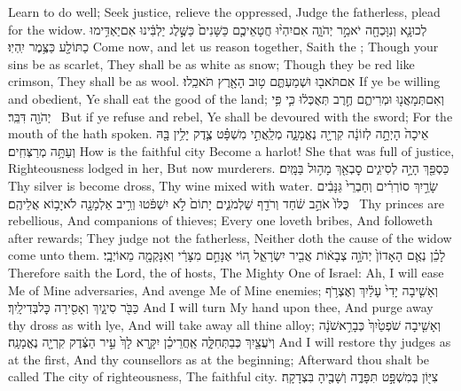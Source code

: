 {Learn to do well; Seek justice, relieve the oppressed, Judge the fatherless, plead for the widow.}
{לְכוּ\maqqaf נָ֛א וְנִוָּכְחָ֖ה יֹאמַ֣ר יְהֹוָ֑ה אִם\maqqaf יִהְי֨וּ חֲטָאֵיכֶ֤ם כַּשָּׁנִים֙ כַּשֶּׁ֣לֶג יַלְבִּ֔ינוּ אִם\maqqaf יַאְדִּ֥ימוּ כַתּוֹלָ֖ע כַּצֶּ֥מֶר יִֽהְיֽוּ׃}
{Come now, and let us reason together, Saith the \lord; Though your sins be as scarlet, They shall be as white as snow; Though they be red like crimson, They shall be as wool.}
{אִם\maqqaf תֹּאב֖וּ וּשְׁמַעְתֶּ֑ם ט֥וּב הָאָ֖רֶץ תֹּאכֵֽלוּ׃}
{If ye be willing and obedient, Ye shall eat the good of the land;}
{וְאִם\maqqaf תְּמָאֲנ֖וּ וּמְרִיתֶ֑ם חֶ֣רֶב תְּאֻכְּל֔וּ כִּ֛י פִּ֥י יְהֹוָ֖ה דִּבֵּֽר׃ \petucha }
{But if ye refuse and rebel, Ye shall be devoured with the sword; For the mouth of the \lord\space hath spoken.}
{אֵיכָה֙ הָיְתָ֣ה לְזוֹנָ֔ה קִרְיָ֖ה נֶאֱמָנָ֑ה מְלֵֽאֲתִ֣י מִשְׁפָּ֗ט צֶ֛דֶק יָלִ֥ין בָּ֖הּ וְעַתָּ֥ה מְרַצְּחִֽים׃}
{How is the faithful city Become a harlot! She that was full of justice, Righteousness lodged in her, But now murderers.}
{כַּסְפֵּ֖ךְ הָיָ֣ה לְסִיגִ֑ים סׇבְאֵ֖ךְ מָה֥וּל בַּמָּֽיִם׃}
{Thy silver is become dross, Thy wine mixed with water.}
{שָׂרַ֣יִךְ סוֹרְרִ֗ים וְחַבְרֵי֙ גַּנָּבִ֔ים כֻּלּוֹ֙ אֹהֵ֣ב שֹׁ֔חַד וְרֹדֵ֖ף שַׁלְמֹנִ֑ים יָתוֹם֙ לֹ֣א יִשְׁפֹּ֔טוּ וְרִ֥יב אַלְמָנָ֖ה לֹא\maqqaf יָב֥וֹא אֲלֵיהֶֽם׃ \setuma }
{Thy princes are rebellious, And companions of thieves; Every one loveth bribes, And followeth after rewards; They judge not the fatherless, Neither doth the cause of the widow come unto them.}
{לָכֵ֗ן נְאֻ֤ם הָאָדוֹן֙ יְהֹוָ֣ה צְבָא֔וֹת אֲבִ֖יר יִשְׂרָאֵ֑ל ה֚וֹי אֶנָּחֵ֣ם מִצָּרַ֔י וְאִנָּקְמָ֖ה מֵאוֹיְבָֽי׃}
{Therefore saith the Lord, the \lord\space of hosts, The Mighty One of Israel: Ah, I will ease Me of Mine adversaries, And avenge Me of Mine enemies;}
{וְאָשִׁ֤יבָה יָדִי֙ עָלַ֔יִךְ וְאֶצְרֹ֥ף כַּבֹּ֖ר סִיגָ֑יִךְ וְאָסִ֖ירָה כׇּל\maqqaf בְּדִילָֽיִךְ׃}
{And I will turn My hand upon thee, And purge away thy dross as with lye, And will take away all thine alloy;}
{וְאָשִׁ֤יבָה שֹׁפְטַ֙יִךְ֙ כְּבָרִ֣אשֹׁנָ֔ה וְיֹעֲצַ֖יִךְ כְּבַתְּחִלָּ֑ה אַֽחֲרֵי\maqqaf כֵ֗ן יִקָּ֤רֵא לָךְ֙ עִ֣יר הַצֶּ֔דֶק קִרְיָ֖ה נֶאֱמָנָֽה׃}
{And I will restore thy judges as at the first, And thy counsellors as at the beginning; Afterward thou shalt be called The city of righteousness, The faithful city.}
{צִיּ֖וֹן בְּמִשְׁפָּ֣ט תִּפָּדֶ֑ה וְשָׁבֶ֖יהָ בִּצְדָקָֽה׃}
